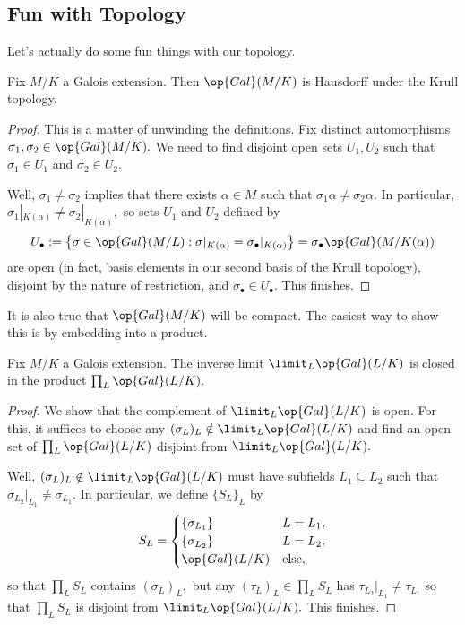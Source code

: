 \documentclass[../notes.tex]{subfiles}
\begin{document}
\subsection{Fun with Topology}
Let's actually do some fun things with our topology.
\begin{proposition}
	Fix $M/K$ a Galois extension. Then $\op{Gal}(M/K)$ is Hausdorff under the Krull topology.
\end{proposition}
\begin{proof}
	This is a matter of unwinding the definitions. Fix distinct automorphisms $\sigma_1,\sigma_2\in\op{Gal}(M/K).$ We need to find disjoint open sets $U_1,U_2$ such that $\sigma_1\in U_1$ and $\sigma_2\in U_2.$

	Well, $\sigma_1\ne\sigma_2$ implies that there exists $\alpha\in M$ such that $\sigma_1\alpha\ne\sigma_2\alpha.$ In particular, $\sigma_1|_{K(\alpha)}\ne\sigma_2|_{K(\alpha)},$ so sets $U_1$ and $U_2$ defined by
	\[U_\bullet:=\left\{\sigma\in\op{Gal}(M/L):\sigma|_{K(\alpha)}=\sigma_\bullet|_{K(\alpha)}\right\}=\sigma_\bullet\op{Gal}(M/K(\alpha))\]
	are open (in fact, basis elements in our second basis of the Krull topology), disjoint by the nature of restriction, and $\sigma_\bullet\in U_\bullet.$ This finishes.
\end{proof}
It is also true that $\op{Gal}(M/K)$ will be compact. The easiest way to show this is by embedding into a product.
\begin{proposition} \label{prop:limitclosed}
	Fix $M/K$ a Galois extension. The inverse limit $\limit_L\op{Gal}(L/K)$ is closed in the product $\prod_L\op{Gal}(L/K).$
\end{proposition}
\begin{proof}
	We show that the complement of $\limit_L\op{Gal}(L/K)$ is open. For this, it suffices to choose any $(\sigma_L)_L\notin\limit_L\op{Gal}(L/K)$ and find an open set of $\prod_L\op{Gal}(L/K)$ disjoint from $\limit_L\op{Gal}(L/K).$

	Well, $(\sigma_L)_L\notin\limit_L\op{Gal}(L/K)$ must have subfields $L_1\subseteq L_2$ such that $\sigma_{L_2}|_{L_1}\ne\sigma_{L_1}.$ In particular, we define $\{S_L\}_L$ by
	\[S_L=\begin{cases}
		\{\sigma_{L_1}\} & L=L_1, \\
		\{\sigma_{L_2}\} & L=L_2, \\
		\op{Gal}(L/K) & \text{else},
	\end{cases}\]
	so that $\prod_LS_L$ contains $(\sigma_L)_L,$ but any $(\tau_L)_L\in\prod_LS_L$ has $\tau_{L_2}|_{L_1}\ne\tau_{L_1}$ so that $\prod_LS_L$ is disjoint from $\limit_L\op{Gal}(L/K).$ This finishes.
\end{proof}
\end{document}
